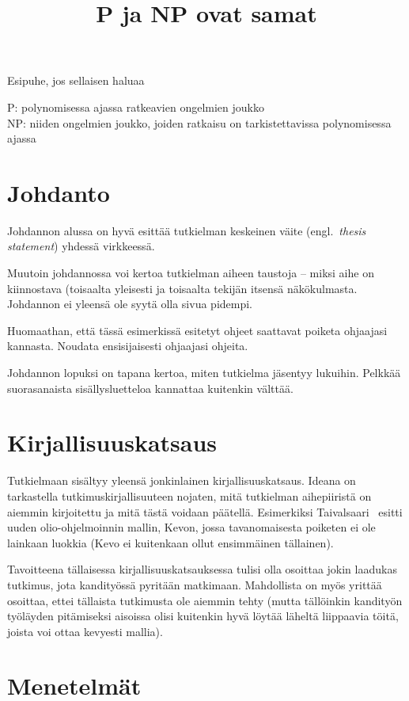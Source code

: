 \documentclass[finnish,utf8,nonumbib,palatino,kandi]{gradu2}
\title{P ja NP ovat samat}
\begin{document}
\preface
Esipuhe, jos sellaisen haluaa

\termlist
P: polynomisessa ajassa ratkeavien ongelmien joukko \\
NP: niiden ongelmien joukko, joiden ratkaisu on tarkistettavissa polynomisessa ajassa

\mainmatter

\section{Johdanto}

Johdannon alussa on hyvä esittää tutkielman keskeinen väite
(engl.~\emph{thesis statement}) yhdessä virkkeessä.

Muutoin johdannossa voi kertoa tutkielman aiheen taustoja -- miksi
aihe on kiinnostava (toisaalta yleisesti ja toisaalta tekijän itsensä
näkökulmasta.  Johdannon ei yleensä ole syytä olla sivua pidempi.

Huomaathan, että tässä esimerkissä esitetyt ohjeet saattavat poiketa
ohjaajasi kannasta.  Noudata ensisijaisesti ohjaajasi ohjeita.

Johdannon lopuksi on tapana kertoa, miten tutkielma jäsentyy lukuihin.
Pelkkää suorasanaista sisällysluetteloa kannattaa kuitenkin välttää.

\section{Kirjallisuuskatsaus}

Tutkielmaan sisältyy yleensä jonkinlainen kirjallisuuskatsaus.  Ideana
on tarkastella tutkimuskirjallisuuteen nojaten, mitä tutkielman
aihepiiristä on aiemmin kirjoitettu ja mitä tästä voidaan päätellä.
Esimerkiksi
Taivalsaari~\cite{taivalsaari93:_critic_view_inher_reusab_objec_progr}
esitti uuden olio-ohjelmoinnin mallin, Kevon, jossa tavanomaisesta
poiketen ei ole lainkaan luokkia (Kevo ei kuitenkaan ollut ensimmäinen
tällainen).

Tavoitteena tällaisessa kirjallisuuskatsauksessa tulisi olla osoittaa
jokin laadukas tutkimus, jota kandityössä pyritään matkimaan.
Mahdollista on myös yrittää osoittaa, ettei tällaista tutkimusta ole
aiemmin tehty (mutta tällöinkin kandityön työläyden pitämiseksi
aisoissa olisi kuitenkin hyvä löytää läheltä liippaavia töitä, joista
voi ottaa kevyesti mallia).

\section{Menetelmät}
\end{document}
